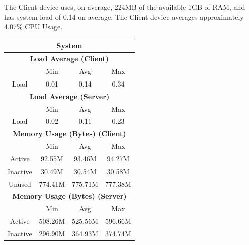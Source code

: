 \documentclass[11pt,a4paper]{scrreprt}
\begin{document}
The Client device uses, on average, 224MB of the available 1GB of RAM,
and has system load of 0.14 on average. The Client device averages
approximately 4.07\% CPU Usage.

\begin{table}[H]
\centering
    \begin{tabular}{||c|c|c|c|c|c|c||}
    \hline
    \multicolumn{7}{|c|}{\textbf{System}} \\
    \hline
    \multicolumn{7}{|c|}{\textbf{Load Average (Client)}} \\
    \hline\hline
      & \multicolumn{2}{|c|}{Min} & \multicolumn{2}{|c|}{Avg} & \multicolumn{2}{|c|}{Max} \\
    \hline
    Load & \multicolumn{2}{|c|}{0.01} & \multicolumn{2}{|c|}{0.14} & \multicolumn{2}{|c|}{0.34} \\
    \hline\hline
    \multicolumn{7}{|c|}{\textbf{Load Average (Server)}} \\
    \hline\hline
      & \multicolumn{2}{|c|}{Min} & \multicolumn{2}{|c|}{Avg} & \multicolumn{2}{|c|}{Max} \\
    \hline
    Load & \multicolumn{2}{|c|}{0.02} & \multicolumn{2}{|c|}{0.11} & \multicolumn{2}{|c|}{0.23} \\
    \hline\hline
    \multicolumn{7}{|c|}{\textbf{Memory Usage (Bytes) (Client)}} \\
    \hline\hline
      & \multicolumn{2}{|c|}{Min} & \multicolumn{2}{|c|}{Avg} & \multicolumn{2}{|c|}{Max} \\
    \hline
    Active & \multicolumn{2}{|c|}{92.55M} & \multicolumn{2}{|c|}{93.46M} & \multicolumn{2}{|c|}{94.27M} \\
    \hline
    Inactive & \multicolumn{2}{|c|}{30.49M} & \multicolumn{2}{|c|}{30.54M} & \multicolumn{2}{|c|}{30.58M} \\
    \hline
    Unused & \multicolumn{2}{|c|}{774.41M} & \multicolumn{2}{|c|}{775.71M} & \multicolumn{2}{|c|}{777.38M} \\
    \hline\hline
    \multicolumn{7}{|c|}{\textbf{Memory Usage (Bytes) (Server)}} \\
    \hline\hline
      & \multicolumn{2}{|c|}{Min} & \multicolumn{2}{|c|}{Avg} & \multicolumn{2}{|c|}{Max} \\
    \hline
    Active & \multicolumn{2}{|c|}{508.26M} & \multicolumn{2}{|c|}{525.56M} & \multicolumn{2}{|c|}{596.66M} \\
    \hline
    Inactive & \multicolumn{2}{|c|}{296.90M} & \multicolumn{2}{|c|}{364.93M} & \multicolumn{2}{|c|}{374.74M} \\

\end{tabular}
\end{table}
\end{document}
